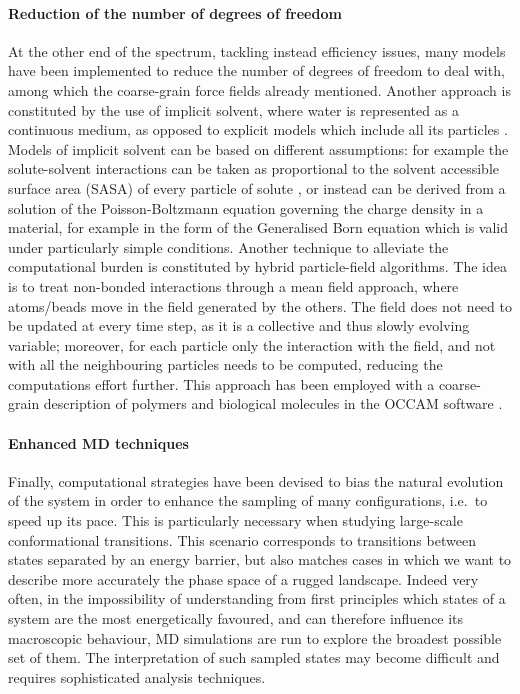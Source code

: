 \paragraph{Reduction of the number of degrees of freedom}
At the other end of the spectrum, tackling instead efficiency issues, many models have been implemented to reduce the number of degrees of freedom to deal with, among which the coarse-grain force fields already mentioned.
%
Another approach is constituted by the use of implicit solvent, where water is represented as a continuous medium, as opposed to explicit models which include all its particles \cite{Kleinjung2014}.
%
Models of implicit solvent can be based on different assumptions: for example the solute-solvent interactions can be taken as proportional to the solvent accessible surface area (SASA) of every particle of solute \cite{Fraternali1996,Kleinjung2003,Kleinjung2012,Fornili2012}, or instead can be derived from a solution of the Poisson-Boltzmann equation governing the charge density in a material, for example in the form of the Generalised Born equation \cite{Zhu2005} which is valid under particularly simple conditions.
%
Another technique to alleviate the computational burden is constituted by hybrid particle-field algorithms. The idea is to treat non-bonded interactions through a mean field approach, where atoms/beads move in the field generated by the others. The field does not need to be updated at every time step, as it is a collective and thus slowly evolving variable; moreover, for each particle only the interaction with the field, and not with all the neighbouring particles needs to be computed, reducing the computations effort further. This approach has been employed with a coarse-grain description of polymers and biological molecules in the OCCAM software \cite{Milano2009}.

\paragraph{Enhanced MD techniques}
Finally, computational strategies have been devised to bias the natural evolution of the system in order to enhance the sampling of many configurations, i.e.\ to speed up its pace.
%
This is particularly necessary when studying large-scale conformational transitions. This scenario corresponds to transitions between states separated by an energy barrier, but also matches cases in which we want to describe more accurately the phase space of a rugged landscape. Indeed very often, in the impossibility of understanding from first principles which states of a system are the most energetically favoured, and can therefore influence its macroscopic behaviour, MD simulations are run to explore the broadest possible set of them. The interpretation of such sampled states may become difficult and requires sophisticated analysis techniques.

